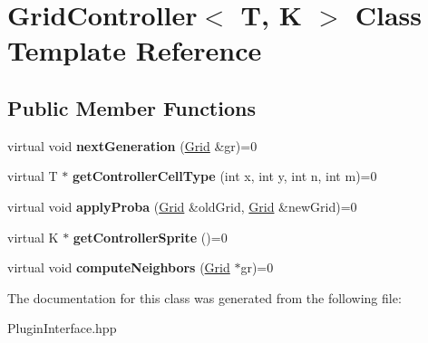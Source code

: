 \hypertarget{classGridController}{\section{Grid\+Controller$<$ T, K $>$ Class Template Reference}
\label{classGridController}
}
\subsection*{Public Member Functions}
\begin{DoxyCompactItemize}
\item 
\hypertarget{classGridController_a22309eb74bd4434b0a3dc523411c13d2}{virtual void {\bfseries next\+Generation} (\hyperlink{classGrid}{Grid} \&gr)=0}\label{classGridController_a22309eb74bd4434b0a3dc523411c13d2}

\item 
\hypertarget{classGridController_ac1745f94bcdf969062de4162ad14cd27}{virtual T $\ast$ {\bfseries get\+Controller\+Cell\+Type} (int x, int y, int n, int m)=0}\label{classGridController_ac1745f94bcdf969062de4162ad14cd27}

\item 
\hypertarget{classGridController_ab0ff8294bbfc36af3ce0ef73e88147a1}{virtual void {\bfseries apply\+Proba} (\hyperlink{classGrid}{Grid} \&old\+Grid, \hyperlink{classGrid}{Grid} \&new\+Grid)=0}\label{classGridController_ab0ff8294bbfc36af3ce0ef73e88147a1}

\item 
\hypertarget{classGridController_a2571854fcf80a68168ae5c63d83e44f4}{virtual K $\ast$ {\bfseries get\+Controller\+Sprite} ()=0}\label{classGridController_a2571854fcf80a68168ae5c63d83e44f4}

\item 
\hypertarget{classGridController_a55f83317b9deeda185dc30cd9fa4d987}{virtual void {\bfseries compute\+Neighbors} (\hyperlink{classGrid}{Grid} $\ast$gr)=0}\label{classGridController_a55f83317b9deeda185dc30cd9fa4d987}

\end{DoxyCompactItemize}


The documentation for this class was generated from the following file\+:\begin{DoxyCompactItemize}
\item 
Plugin\+Interface.\+hpp\end{DoxyCompactItemize}
